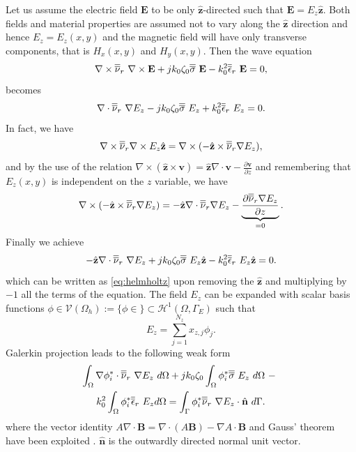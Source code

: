 Let us assume the electric field $\mathbf{E}$ to be only $\hat{\mathbf{z}}$-directed such that $\mathbf{E} = E_z \hat{\mathbf{z}}$. Both fields and material properties are assumed not to vary along the $\hat{\mathbf{z}}$ direction and hence $E_z = E_z(x,y)$ and the magnetic field will have only transverse components, that is $H_x(x,y)$ and $H_y(x,y)$. Then the wave equation 
$$\nabla \times \overline{\overline{\nu}}_r \ \nabla \times {\mathbf{E}} + j k_0 \zeta_0 \overline{\overline{\sigma}} \ {\mathbf{E}} - k_0^2 \overline{\overline{\epsilon}}_r \ {\mathbf{E}} = 0,$$
\noindent becomes
\begin{equation}
\label{eq:helmholtz}
\nabla \cdot \dyad{\nu}_r \ \nabla {E_z} - j k_0 \zeta_0 \dyad{\sigma} \ {E_z} + k_0^2 \dyad{\epsilon}_r \ {E_z} = 0.
\end{equation}
\noindent In fact, we have
$$\nabla \times \overline{\overline{\nu}}_r \nabla \times E_z \hat{\mathbf{z}} = \nabla \times  (-\hat{\mathbf{z}} \times \overline{\overline{\nu}}_r \nabla E_z), $$
\noindent and by the use of the relation \cite{van2007electromagnetic} $\nabla \times  (\hat{\mathbf{z}} \times \mathbf{v}) = \hat{\mathbf{z}} \nabla \cdot \mathbf{v} - \frac{\partial \mathbf{v}}{\partial z}$ and remembering that $E_z(x,y)$ is independent on the $z$ variable, we have
$$\nabla \times (-\hat{\mathbf{z}} \times \overline{\overline{\nu}}_r \nabla E_z) = -\hat{\mathbf{z}} \nabla \cdot \overline{\overline{\nu}}_r \nabla E_z - \underbrace{\frac{\partial \overline{\overline{\nu}}_r \nabla E_z}{\partial z}}_{= 0}.$$
\noindent Finally we achieve
$$
-\hat{\mathbf{z}} \nabla \cdot \overline{\overline{\nu}}_r \ \nabla {E_z} + j k_0 \zeta_0 \overline{\overline{\sigma}} \ {E_z \hat{\mathbf{z}}} - k_0^2 \overline{\overline{\epsilon}}_r \ {E_z \hat{\mathbf{z}}} = 0.
$$
\noindent which can be written as \eqref{eq:helmholtz} upon removing the $\hat{\mathbf{z}}$ and multiplying by $-1$ all the terms of the equation. The field $E_z$ can be expanded with scalar basis functions $\phi \in \mathcal{V}(\Omega_h) := \{ \phi \in  \} \subset \mathcal{H}^1(\Omega, \Gamma_E)$ such that
$$E_{z} = \sum_{j=1}^{N_z} x_{z,j} \phi_j.$$
\noindent Galerkin projection leads to the following weak form
\begin{multline}
\int_\Omega \nabla \phi_i^* \cdot \overline{\overline{\nu}}_r \ \nabla {E_z} \ d\Omega + j k_0 \zeta_0 \int_\Omega \phi_i^* \overline{\overline{\sigma}} \ {E_z} \ d\Omega \ - \ \\ k_0^2 \int_\Omega \phi_i^* \overline{\overline{\epsilon}}_r \ {E_z} d\Omega = \int_\Gamma \phi_i^* \overline{\overline{\nu}}_r \ \nabla {E_z} \cdot \hat{\mathbf{n}} \ d\Gamma.
\end{multline}
\noindent where the vector identity $A \nabla \cdot \mathbf{B} = \nabla \cdot (A \mathbf{B} ) - \nabla A \cdot \mathbf{B}$ and Gauss' theorem have been exploited \cite{van2007electromagnetic}. $\hat{\mathbf{n}}$ is the outwardly directed normal unit vector.

